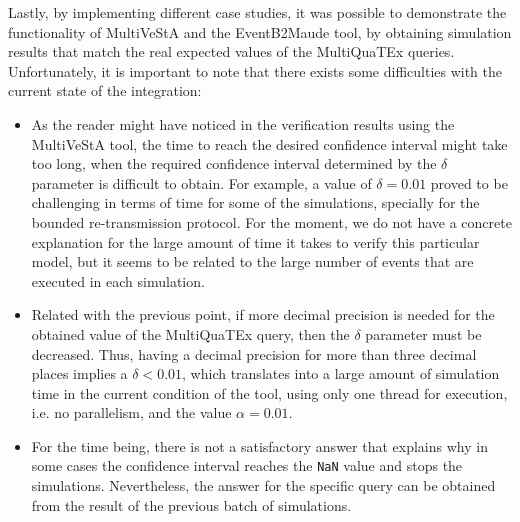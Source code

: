 Lastly, by implementing different case studies, it was possible to demonstrate the functionality of MultiVeStA and the EventB2Maude tool, by obtaining simulation results that match the real expected values of the MultiQuaTEx queries. Unfortunately, it is important to note that there exists some difficulties with the current state of the integration:
\begin{itemize}
    \item As the reader might have noticed in the verification results using the MultiVeStA tool, the time to reach the desired confidence interval might take too long, when the required confidence interval determined by the $\delta$ parameter is difficult to obtain. For example, a value of $\delta = 0.01$ proved to be challenging in terms of time for some of the simulations, specially for the bounded re-transmission protocol. For the moment, we do not have a concrete explanation for the large amount of time it takes to verify this particular model, but it seems to be related to the large number of events that are executed in each simulation.
    
    \item Related with the previous point, if more decimal precision is needed for the obtained value of the MultiQuaTEx query, then the $\delta$ parameter must be decreased. Thus, having a decimal precision for more than three decimal places implies a $\delta < 0.01$, which translates into a large amount of simulation time in the current condition of the tool, using only one thread for execution, i.e. no parallelism, and the value $\alpha = 0.01$.

    \item For the time being, there is not a satisfactory answer that explains why in some cases the confidence interval reaches the \texttt{NaN} value and stops the simulations. Nevertheless, the answer for the specific query can be obtained from the result of the previous batch of simulations.
\end{itemize}

